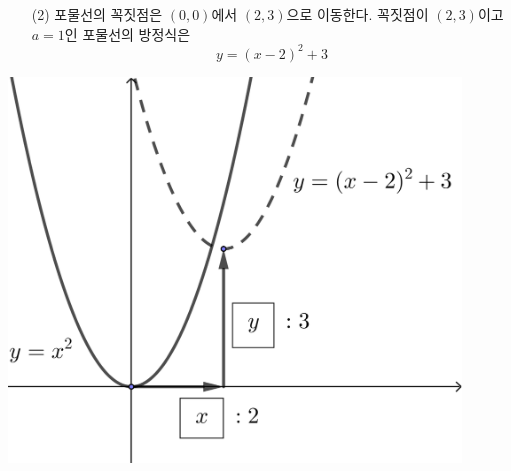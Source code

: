 \documentclass{oblivoir}
\begin{document}
\begin{mdframed}\begin{minipage}{0.49\textwidth}
\begin{enumerate}[topsep=0pt]
\item[(2)]
포물선의 꼭짓점은
\((0,0)\)에서 \((2,3)\)으로 이동한다.
꼭짓점이 \((2,3)\)이고
\(a=1\)인 포물선의 방정식은
\[y=(x-2)^2+3\]
\end{enumerate}
\end{minipage}
\begin{minipage}{0.49\textwidth}
\begin{center}
\includegraphics[width=0.9\textwidth]{ttranslate_2-2}
\end{center}
\end{minipage}\end{mdframed}
\end{document}
